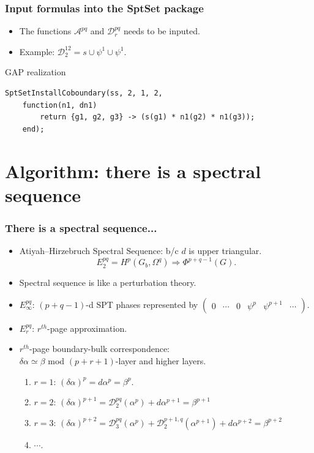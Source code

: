 \documentclass[xcolor=table, aspectratio=169]{beamer}
\begin{document}
\begin{frame}[fragile]
	\frametitle{Input formulas into the SptSet package}
	\begin{itemize}
		\item The functions $\mathcal A^{pq}$ and $\mathcal D^{pq}_r$ needs to be inputed.
		\item Example: $\mathcal D_2^{12} = s\cup\psi^1\cup\psi^1$.
	\end{itemize}

	\begin{block}{GAP realization}
	\begin{lstlisting}[basicstyle=\footnotesize,morekeywords={function,return,local,if,fi,then,end},showspaces=false,showtabs=false, keywordstyle=\color{blue}]
	SptSetInstallCoboundary(ss, 2, 1, 2,
	function(n1, dn1)
		return {g1, g2, g3} -> (s(g1) * n1(g2) * n1(g3));
	end);
	\end{lstlisting}
	\end{block}

\end{frame}

\section{Algorithm: there is a spectral sequence}

\begin{frame}
	\frametitle{There is a spectral sequence...}
	\begin{itemize}
		\item Atiyah–Hirzebruch Spectral Sequence:
		b/c $d$ is upper triangular.
		\[E^{pq}_2=H^p(G_b,\Omega^q)\Rightarrow \Phi^{p+q-1}(G).\]
		\item Spectral sequence is like a perturbation theory.
		\item $E^{pq}_\infty$: $(p+q-1)$-d SPT phases represented by
		$\begin{pmatrix}0&\cdots&0&\psi^p&\psi^{p+1}&\cdots\end{pmatrix}$.
		\item $E^{pq}_r$: $r^{th}$-page approximation.
		\item $r^{th}$-page boundary-bulk correspondence:\\
		$\delta\alpha\simeq\beta$ mod $(p+r+1)$-layer and higher layers.
		\begin{enumerate}
			\item $r=1$: $(\delta\alpha)^p = d\alpha^p = \beta^p$.
			\item $r=2$: $(\delta\alpha)^{p+1} = \mathcal D^{pq}_2(\alpha^p) + d\alpha^{p+1} = \beta^{p+1}$
			\item $r=3$: $(\delta\alpha)^{p+2} = \mathcal D^{pq}_3(\alpha^p)
			 + \mathcal D^{p+1,q}_2(\alpha^{p+1}) + d\alpha^{p+2} = \beta^{p+2}$
			\item $\cdots$.
		\end{enumerate}
	\end{itemize}
\end{frame}
\end{document}
